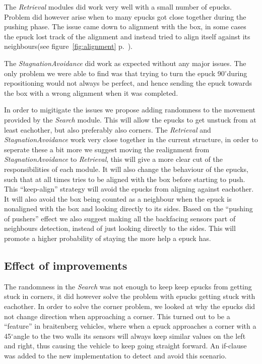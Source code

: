 \documentclass[12pt]{article}
\newcommand{\shiftline}[0]{\hfill\newline\noindent}
\newcommand{\degree}[0]{\ensuremath{^\circ}}
\begin{document}
			\shiftline The \textit{Retrieval} modules did work very well with a small number of epucks. Problem did however arise when to many epucks got close together during
			the pushing phase. The issue came down to alignment with the box, 
			in some cases the epuck lost track of the alignment and instead tried to align itself against its neighbours(see figure~\ref{fig:alignment} p.~\pageref{fig:alignment}). 
			
			\shiftline The \textit{StagnationAvoidance} did work as expected without any major issues. The only problem we were able to find was that trying to turn the
			epuck 90\degree during repositioning would not always be perfect, and hence sending the epuck towards the box with a wrong alignment when it was completed. 
			
			\shiftline In order to migitigate the issues we propose adding randomness to the movement provided by the \textit{Search} module. This will allow the epucks to get 
			unstuck from at least eachother, but also preferably also corners. The \textit{Retrieval} and \textit{StagnationAvoidance} work very close together in the current
			structure, in order to seperate these a bit more we suggest moving the realignment from \textit{StagnationAvoidance} to \textit{Retrieval}, this will give a more 
			clear cut of the responsibilities of each module. It will also change the behaviour of the epucks, such that at all times tries to be aligned with the box
			before starting to push. This "`keep-align"' strategy will avoid the epucks from aligning against eachother. It will also avoid the box being counted as a 
			neighbour when the epuck is nonaligned with the box and looking directly to its sides.
			Based on the "`pushing of pushers"' effect we also suggest making all the backfacing sensors part of neighbours detection, instead of just looking directly
			to the sides. This will promote a higher probability of staying the more help a epuck has.
		
	\subsection{Effect of improvements}
		The randomness in the \textit{Search} was not enough to keep keep epucks from getting stuck in corners, it did however solve the problem with epucks getting stuck with eachother.
		In order to solve the corner problem, we looked at why the epucks did not change direction when approaching a corner. This turned out to be a "`feature"' in braitenberg vehicles, 
		where when a epuck approaches a corner with a 45\degree angle to the two walls its sensors will always keep similar values on the left and right, thus causing the vehicle 
		to keep going straight forward. An if-clause was added to the new implementation to detect and avoid this scenario. 
		
\end{document}
